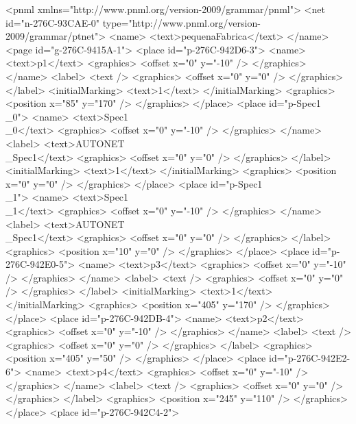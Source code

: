 <pnml xmlns="http://www.pnml.org/version-2009/grammar/pnml">
 <net id="n-276C-93CAE-0" type="http://www.pnml.org/version-2009/grammar/ptnet">
  <name>
   <text>pequenaFabrica</text>
  </name>
  <page id="g-276C-9415A-1">
   <place id="p-276C-942D6-3">
    <name>
     <text>p1</text>
     <graphics>
      <offset x="0" y="-10" />
     </graphics>
    </name>
    <label>
     <text />
     <graphics>
      <offset x="0" y="0" />
     </graphics>
    </label>
    <initialMarking>
     <text>1</text>
    </initialMarking>
    <graphics>
     <position x="85" y="170" />
    </graphics>
   </place>
   <place id="p-Spec1\\_0">
    <name>
     <text>Spec1\\_0</text>
     <graphics>
      <offset x="0" y="-10" />
     </graphics>
    </name>
    <label>
     <text>AUTONET\\_Spec1</text>
     <graphics>
      <offset x="0" y="0" />
     </graphics>
    </label>
    <initialMarking>
     <text>1</text>
    </initialMarking>
    <graphics>
     <position x="0" y="0" />
    </graphics>
   </place>
   <place id="p-Spec1\\_1">
    <name>
     <text>Spec1\\_1</text>
     <graphics>
      <offset x="0" y="-10" />
     </graphics>
    </name>
    <label>
     <text>AUTONET\\_Spec1</text>
     <graphics>
      <offset x="0" y="0" />
     </graphics>
    </label>
    <graphics>
     <position x="10" y="0" />
    </graphics>
   </place>
   <place id="p-276C-942E0-5">
    <name>
     <text>p3</text>
     <graphics>
      <offset x="0" y="-10" />
     </graphics>
    </name>
    <label>
     <text />
     <graphics>
      <offset x="0" y="0" />
     </graphics>
    </label>
    <initialMarking>
     <text>1</text>
    </initialMarking>
    <graphics>
     <position x="405" y="170" />
    </graphics>
   </place>
   <place id="p-276C-942DB-4">
    <name>
     <text>p2</text>
     <graphics>
      <offset x="0" y="-10" />
     </graphics>
    </name>
    <label>
     <text />
     <graphics>
      <offset x="0" y="0" />
     </graphics>
    </label>
    <graphics>
     <position x="405" y="50" />
    </graphics>
   </place>
   <place id="p-276C-942E2-6">
    <name>
     <text>p4</text>
     <graphics>
      <offset x="0" y="-10" />
     </graphics>
    </name>
    <label>
     <text />
     <graphics>
      <offset x="0" y="0" />
     </graphics>
    </label>
    <graphics>
     <position x="245" y="110" />
    </graphics>
   </place>
   <place id="p-276C-942C4-2">
